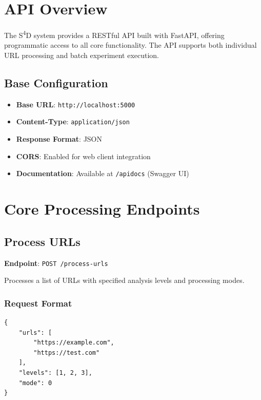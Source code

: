 \section{API Overview}
\label{sec:api-overview}

The S\textsuperscript{4}D system provides a RESTful API built with FastAPI, offering programmatic access to all core functionality. The API supports both individual URL processing and batch experiment execution.

\subsection{Base Configuration}
\label{subsec:base-configuration}

\begin{itemize}
    \item \textbf{Base URL}: \texttt{http://localhost:5000}
    \item \textbf{Content-Type}: \texttt{application/json}
    \item \textbf{Response Format}: JSON
    \item \textbf{CORS}: Enabled for web client integration
    \item \textbf{Documentation}: Available at \texttt{/apidocs} (Swagger UI)
\end{itemize}

\section{Core Processing Endpoints}
\label{sec:core-endpoints}

\subsection{Process URLs}
\label{subsec:process-urls}

\textbf{Endpoint}: \texttt{POST /process-urls}

Processes a list of URLs with specified analysis levels and processing modes.

\subsubsection{Request Format}
\label{subsubsec:request-format}

\begin{verbatim}
{
    "urls": [
        "https://example.com",
        "https://test.com"
    ],
    "levels": [1, 2, 3],
    "mode": 0
}
\end{verbatim}

